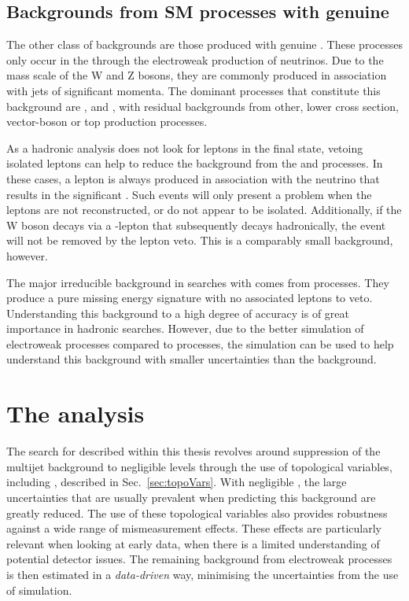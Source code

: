 
\subsection{Backgrounds from SM processes with genuine
\MET}

The other class of \SM backgrounds are those produced with genuine
\MET. These processes only occur in the \SM through the electroweak
production of neutrinos. Due to the
mass scale of the W and Z bosons, they are commonly produced in
association with jets of significant momenta. The dominant
processes that constitute this background are \wj, \zj and \ttbar,
with residual backgrounds from other, lower cross section,
vector-boson or top production processes.

As a hadronic analysis does not look for leptons in the final state,
vetoing isolated leptons can help to reduce the background from the
\wj and \ttbar processes. In these cases, a lepton is always produced
in association with the neutrino that results in the significant \MET.
Such events will only present a problem when the leptons are not
reconstructed, or do not appear to be isolated. Additionally, if the W boson
decays via a \tau-lepton that subsequently decays hadronically, the
event will not be removed by the lepton veto.  This is a comparably
small background, however.

The major irreducible background in \BSM searches with \MET comes from 
\znunu processes. They produce a pure missing energy signature with no
associated leptons to veto. Understanding this background to a high
degree of accuracy is of great importance in hadronic \BSM searches. However, due
to the better simulation of electroweak processes compared to \QCD
processes, the simulation can be used to help understand this
background with smaller uncertainties than the \QCD background.

\section{The \alphat analysis} 

The search for \SUSY described within this thesis revolves around
suppression of the \QCD multijet background to negligible levels
through the use of topological variables, including \alphat, described
in Sec.~\ref{sec:topoVars}. With negligible \QCD, the large
uncertainties that are usually prevalent when predicting this
background are greatly reduced. The use of these topological variables
also provides robustness against a wide range of mismeasurement
effects. These effects are particularly relevant when looking at early
data, when there is a limited understanding of potential detector
issues. The remaining background from electroweak processes is then
estimated in a \emph{data-driven} way, minimising the uncertainties
from the use of simulation.

